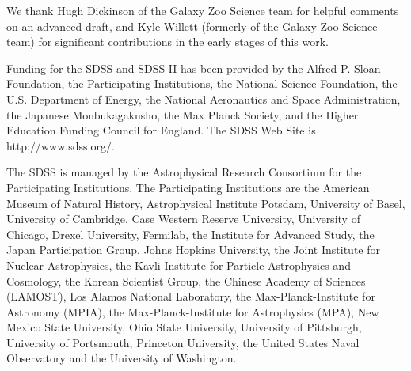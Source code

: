 \documentclass[usenatbib]{mn2e}
\begin{document}
We thank Hugh Dickinson of the Galaxy Zoo Science team for helpful comments on an advanced draft, and Kyle Willett (formerly of the Galaxy Zoo Science team) for significant contributions in the early stages of this work. 

Funding for the SDSS and SDSS-II has been provided by the Alfred P. Sloan Foundation, the Participating Institutions, the National Science Foundation, the U.S. Department of Energy, the National Aeronautics and Space Administration, the Japanese Monbukagakusho, the Max Planck Society, and the Higher Education Funding Council for England. The SDSS Web Site is http://www.sdss.org/. 

The SDSS is managed by the Astrophysical Research Consortium for the Participating Institutions. The Participating Institutions are the American Museum of Natural History, Astrophysical  Institute Potsdam, University of Basel, University of Cambridge, 
Case Western Reserve University, University of Chicago, Drexel University, Fermilab, the Institute for Advanced Study, the Japan 
Participation Group, Johns Hopkins University, the Joint Institute for Nuclear Astrophysics, the Kavli Institute for Particle Astrophysics and Cosmology, the Korean Scientist Group, the Chinese Academy of Sciences (LAMOST), Los Alamos National Laboratory, the Max-Planck-Institute for Astronomy (MPIA), the Max-Planck-Institute for Astrophysics (MPA), New Mexico State University, Ohio State University, University of Pittsburgh, University of Portsmouth, Princeton University, the United States Naval Observatory and the University of Washington. 

{}

\end{document}
